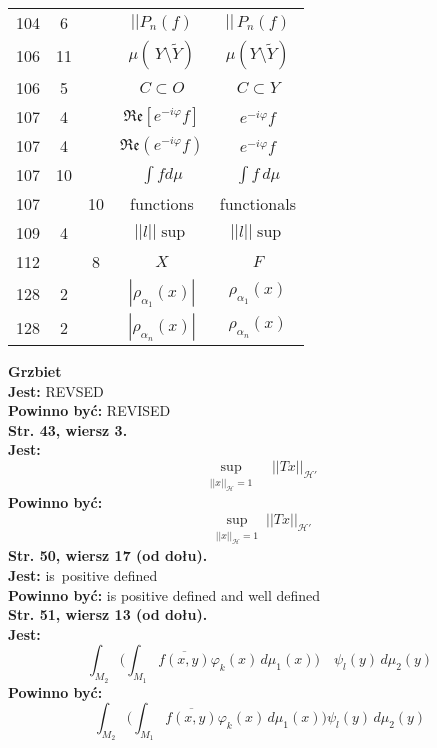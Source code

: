 \documentclass[a4paper,11pt]{article}
\newcommand{\ol}{\overline}
\newcommand{\wt}{\widetilde}
\newcommand{\mc}{\mathcal}
\newcommand{\mf}{\mathfrak}
\newcommand{\al}{\alpha}
\newcommand{\vp}{\varphi}
\newcommand{\Hc}{\mc{H}}
\newcommand{\subs}{\subset}
\newcommand{\setm}{\setminus}
\newcommand{\Real}{\mf{Re}}
\newcommand{\Int}{\int\limits}
\newcommand{\IntCaD}[2] { \Int #1 \, d#2 } %
\newcommand{\norm}[1]{\left|\left| #1 \right|\right|}
\newcommand{\tb}{\textbf}
\newcommand{\noi}{\noindent}
\newcommand{\StrWg}[2]{\tb{Str. #1, wiersz #2.}}
\newcommand{\StrWd}[2]{\tb{Str. #1, wiersz #2 (od dołu).}}
\newcommand{\Jest}{\tb{Jest: }}
\newcommand{\Pow}{\tb{Powinno być: }}
\begin{document}
\begin{center}
\begin{tabular}{|c|c|c|c|c|}
    104 & 6 & & $||P_{ n }( f )$ & $|| \, P_{ n }( f )$ \\
    106 & 11 & & $\mu( \, Y \setm \wt{ Y } )$
           & $\mu( Y \setm \wt{ Y } )$ \\
    106 & 5 & & $C \subs O$ & $C \subs Y$ \\
    107 & 4 & & $\Real[ e^{ -i \vp } f ]$ & $e^{ -i \vp } f$ \\
    107 & 4 & & $\Real( e^{ -i \vp } f )$ & $e^{ -i \vp } f$ \\
    107 & 10 & & $\int\! fd\mu$ & $\IntCaD{ f }{ \mu }$ \\
    107 & & 10 & functions & functionals \\
    109 & 4 & & $\norm{ l }\!\sup$ & $\norm{ l } \sup$ \\
    112 & & 8 & $X$ & $F$ \\
    128 & 2 & & $| \rho_{ \al_{ 1 } }( x ) |$ & $\rho_{ \al_{ 1 } }( x )$ \\
    128 & 2 & & $| \rho_{ \al_{ n } }( x ) |$ & $\rho_{ \al_{ n } }( x )$ \\
    \hline
  \end{tabular}
\end{center}
\noi
\tb{Grzbiet} \\
\Jest REVSED \\
\Pow REVISED \\
\StrWg{43}{3} \\
\Jest
\begin{equation*}
  \sup_{ \substack{ \norm{ x }_{ \Hc } = 1 } } \;\;\; \norm{ T x }_{ \Hc' }
\end{equation*}
\Pow
\begin{equation*}
  \sup_{ \substack{ \norm{ x }_{ \Hc } = 1 } } \norm{ T x }_{ \Hc' }
\end{equation*}
\StrWd{50}{17} \\
\Jest is~positive defined \\
\Pow is positive defined and well defined \\
\StrWd{51}{13} \\
\Jest
\begin{equation*}
  \int_{ M_{ 2 } } \bigg( \int_{ M_{ 1 } } \ol{ f( x, y ) } \vp_{ k }( x ) \,
  d\mu_{ 1 }( x ) \bigg) \quad \psi_{ l }( y ) \, d\mu_{ 2 }( y )
\end{equation*}
\Pow
\begin{equation*}
  \int_{ M_{ 2 } } \bigg( \int_{ M_{ 1 } } \ol{ f( x, y ) } \vp_{ k }( x ) \,
  d\mu_{ 1 }( x ) \bigg) \psi_{ l }( y ) \, d\mu_{ 2 }( y )
\end{equation*}





 {}
\end{document}
